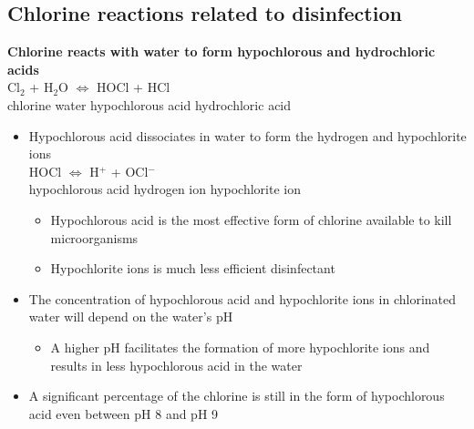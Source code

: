\subsection{Chlorine reactions related to disinfection}


\textbf{Chlorine reacts with water to form hypochlorous and hydrochloric acids}\\
Cl$_2$ \hspace{0.8cm}	+ \hspace{0.3 cm}	 H$_2$O		\hspace{0.8cm} $\iff$ 
\hspace{0.8cm} HOCl	\hspace{0.8cm}	 +	\hspace{0.8cm}	 HCl \\
chlorine \hspace{0.8cm}	water \hspace{1.8cm}		 hypochlorous acid	\hspace{0.1cm}	 hydrochloric acid\\ 
	\vspace{0.5cm}
	\begin{itemize}
		\item Hypochlorous acid dissociates in water to form the hydrogen and hypochlorite ions\\
 HOCl \hspace{1.8 cm} $\iff$ \hspace{1.8 cm} H$^+$ \hspace{1.8cm} + 	\hspace{0.8cm}OCl$^-$\\ 
hypochlorous acid  \hspace{1.9 cm}      hydrogen ion   \hspace{1.5cm}           hypochlorite ion

		\begin{itemize}
			\item Hypochlorous acid is the most effective form of chlorine available to kill microorganisms
			\item Hypochlorite ions is much less efficient disinfectant
		\end{itemize}

		\item The concentration of hypochlorous acid and hypochlorite ions  in chlorinated water will depend on the water's pH
		\begin{itemize}
			\item A higher pH facilitates the formation of more hypochlorite ions and results in less hypochlorous acid in the water
		\end{itemize}
		\item A significant percentage of the chlorine is still in the form of hypochlorous acid even between pH 8 and pH 9
		\end{itemize}


